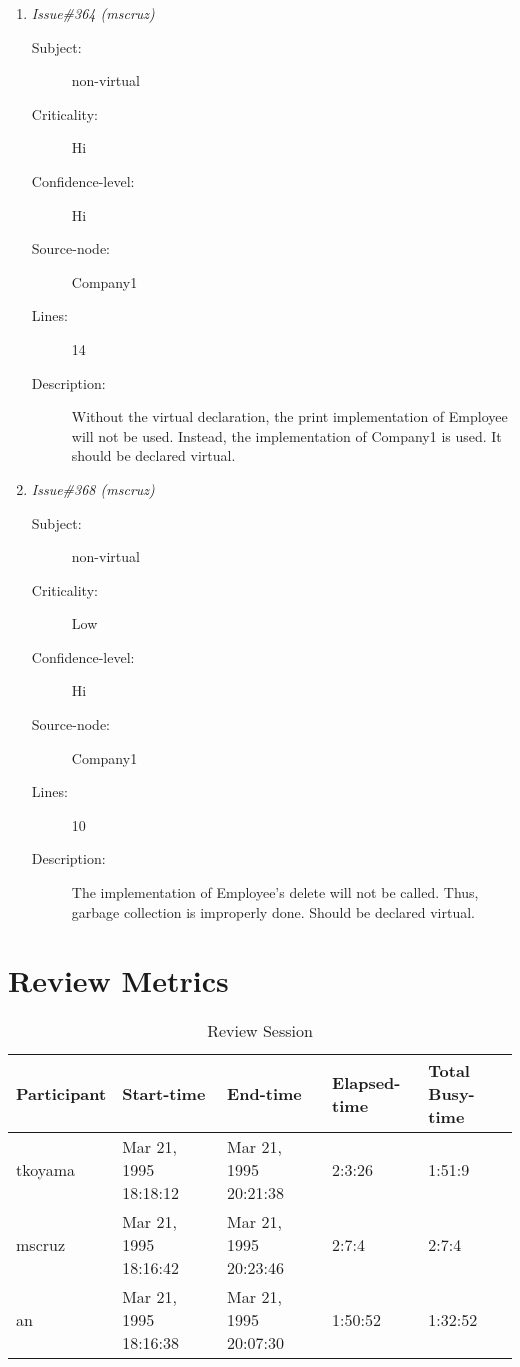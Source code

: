 \begin{enumerate}
\begin{description}
\item [Lines:] 7

\item [Description:] There is no implementation of this function.
Thus, this line could be eliminated.
\end{description}
\item {\it Issue\#364 (mscruz)}
\begin{description}
\item [Subject:] non-virtual
\item [Criticality:] Hi
\item [Confidence-level:] Hi
\item [Source-node:] Company1

\item [Lines:] 14

\item [Description:] Without the virtual declaration, the print
implementation of Employee will not be used.  Instead, the implementation of
Company1 is used.  It should be declared virtual.
\end{description}
\item {\it Issue\#368 (mscruz)}
\begin{description}
\item [Subject:] non-virtual
\item [Criticality:] Low
\item [Confidence-level:] Hi
\item [Source-node:] Company1

\item [Lines:] 10

\item [Description:] The implementation of Employee's delete will
not be called.  Thus, garbage collection is improperly done.  Should be
declared virtual.
\end{description}
\end{enumerate}
\section{Review Metrics}
\begin{table}[hb]
\begin{center}
\begin{tabular}{|l|l|l|l|l|}
\hline
Participant & Start-time & End-time & Elapsed-time & Total Busy-time \\
\hline
tkoyama & Mar 21, 1995 18:18:12 & Mar 21, 1995 20:21:38 & 2:3:26 & 1:51:9 \\
mscruz & Mar 21, 1995 18:16:42 & Mar 21, 1995 20:23:46 & 2:7:4 & 2:7:4 \\
an & Mar 21, 1995 18:16:38 & Mar 21, 1995 20:07:30 & 1:50:52 & 1:32:52 \\
\hline
\end{tabular}
\end{center}
\caption{Review Session}
\end{table}



